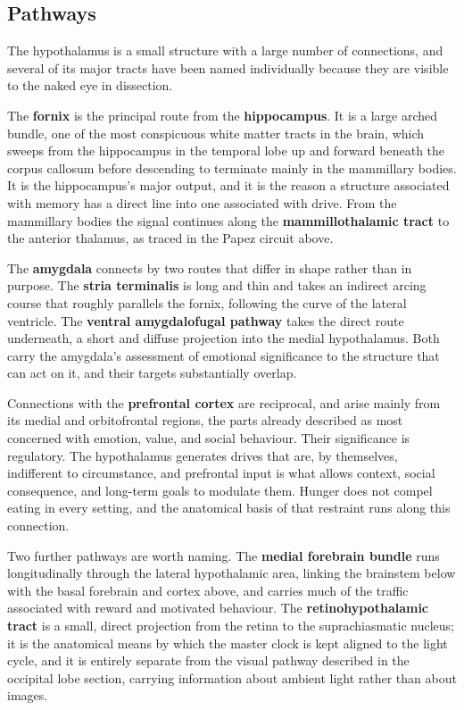 \documentclass[11pt]{article}
\begin{document}
\subsection{Pathways}

The hypothalamus is a small structure with a large number of connections, and several of its major tracts have been named individually because they are visible to the naked eye in dissection.

The \textbf{fornix} is the principal route from the \textbf{hippocampus}. It is a large arched bundle, one of the most conspicuous white matter tracts in the brain, which sweeps from the hippocampus in the temporal lobe up and forward beneath the corpus callosum before descending to terminate mainly in the mammillary bodies. It is the hippocampus's major output, and it is the reason a structure associated with memory has a direct line into one associated with drive. From the mammillary bodies the signal continues along the \textbf{mammillothalamic tract} to the anterior thalamus, as traced in the Papez circuit above.

The \textbf{amygdala} connects by two routes that differ in shape rather than in purpose. The \textbf{stria terminalis} is long and thin and takes an indirect arcing course that roughly parallels the fornix, following the curve of the lateral ventricle. The \textbf{ventral amygdalofugal pathway} takes the direct route underneath, a short and diffuse projection into the medial hypothalamus. Both carry the amygdala's assessment of emotional significance to the structure that can act on it, and their targets substantially overlap.

Connections with the \textbf{prefrontal cortex} are reciprocal, and arise mainly from its medial and orbitofrontal regions, the parts already described as most concerned with emotion, value, and social behaviour. Their significance is regulatory. The hypothalamus generates drives that are, by themselves, indifferent to circumstance, and prefrontal input is what allows context, social consequence, and long-term goals to modulate them. Hunger does not compel eating in every setting, and the anatomical basis of that restraint runs along this connection.

Two further pathways are worth naming. The \textbf{medial forebrain bundle} runs longitudinally through the lateral hypothalamic area, linking the brainstem below with the basal forebrain and cortex above, and carries much of the traffic associated with reward and motivated behaviour. The \textbf{retinohypothalamic tract} is a small, direct projection from the retina to the suprachiasmatic nucleus; it is the anatomical means by which the master clock is kept aligned to the light cycle, and it is entirely separate from the visual pathway described in the occipital lobe section, carrying information about ambient light rather than about images.
\end{document}
